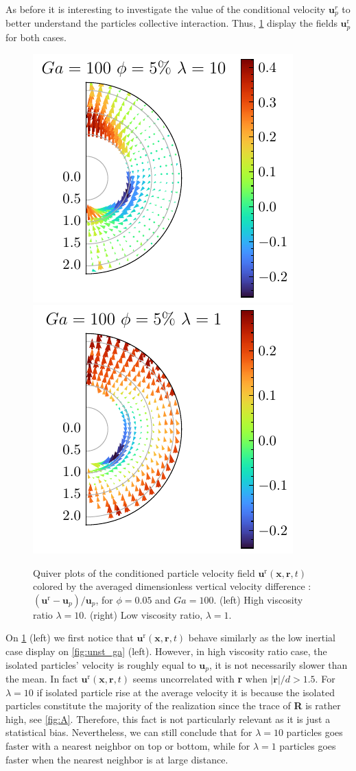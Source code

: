 As before it is interesting to investigate the value of the conditional velocity $\textbf{u}^r_p$ to better understand the particles collective interaction. 
Thus, \ref{fig:unst_l} display the fields  $\textbf{u}_p^\text{r}$ for both cases. 
\begin{figure}[h!]
    \centering
    \includegraphics[height=0.35\textwidth]{image/HOMOGENEOUS_NEW/Dist/U_l_10_Ga_100_PHI_5.pdf}
    \includegraphics[height=0.35\textwidth]{image/HOMOGENEOUS_NEW/Dist/U_l_1_Ga_100_PHI_5.pdf}
    \caption{
         Quiver plots of the conditioned particle velocity field $\textbf{u}^\text{r}(\textbf{x},\textbf{r},t)$ colored by the averaged dimensionless vertical velocity difference : $(\textbf{u}^\text{r} - \textbf{u}_p )/ \textbf{u}_p$, for $\phi = 0.05$ and $Ga = 100$. 
         (left) High viscosity ratio $\lambda = 10$.
         (right) Low viscosity ratio, $\lambda = 1$.
         }
    \label{fig:unst_l}
\end{figure}
On \ref{fig:unst_l} (left) we first notice that $\textbf{u}^\text{r}(\textbf{x},\textbf{r},t)$ behave similarly as the low inertial case display on \ref{fig:unst_ga} (left).
However, in high viscosity ratio case, the isolated particles' velocity is roughly equal to $\textbf{u}_p$, it is not necessarily slower than the mean. 
In fact $\textbf{u}^\text{r}(\textbf{x},\textbf{r},t)$ seems uncorrelated with \textbf{r} when $|\textbf{r}| /d >1.5$. 
For $\lambda = 10$ if isolated particle rise at the average velocity it is because the isolated particles constitute the majority of the realization since the trace of \textbf{R} is rather high, see \ref{fig:A}.
Therefore, this fact is not particularly relevant as it is just a statistical bias. 
Nevertheless, we can still conclude that for $\lambda = 10$ particles goes faster with a nearest neighbor on top or bottom, while for  $\lambda = 1$ particles goes faster when the nearest neighbor is at large distance. 


